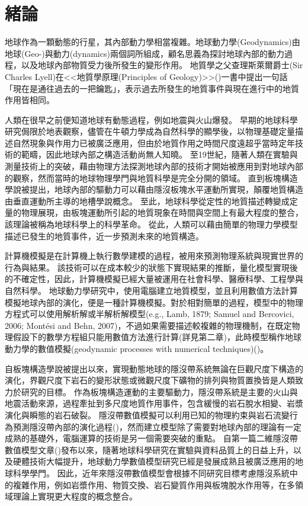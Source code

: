 
\chapter{緒論}

地球作為一顆動態的行星，其內部動力學相當複雜。地球動力學(Geodynamics)由地球(Geo-)與動力(dynamics)兩個詞所組成，顧名思義為探討地球內部的動力過程，以及地球內部物質受力後所發生的變形作用。
地質學之父查理斯萊爾爵士(Sir Charles Lyell)在<<地質學原理(Principles of Geology)>>(\citealp{lyell2009})一書中提出一句話「現在是通往過去的一把鑰匙」，表示過去所發生的地質事件與現在進行中的地質作用皆相同。

人類在很早之前便知道地球有動態過程，例如地震與火山爆發。
早期的地球科學研究侷限於地表觀察，儘管在牛頓力學成為自然科學的顯學後，以物理基礎定量描述自然現象與作用力已被廣泛應用，但由於地質作用之時間尺度遠超乎當時定年技術的範疇，因此地球內部之構造活動尚無人知曉。
至19世紀，隨著人類在實驗與測量技術上的突破，藉由物理方法探測地球內部的技術才開始被應用到對地球內部的觀察，然而當時的地球物理學門與地質科學是完全分開的領域。
直到板塊構造學說被提出，地球內部的驅動力可以藉由隱沒板塊水平運動所實現，顛覆地質構造由垂直運動所主導的地槽學說概念。
至此，地球科學從定性的地質描述轉變成定量的物理展現，由板塊運動所引起的地質現象在時間與空間上有最大程度的整合，該理論被稱為地球科學上的科學革命。
從此，人類可以藉由簡單的物理力學模型描述已發生的地質事件，近一步預測未來的地質構造。

計算機模擬是在計算機上執行數學建模的過程，被用來預測物理系統與現實世界的行為與結果。
該技術可以在成本較少的狀態下實現結果的推斷，量化模型實現後的不確定性，因此，計算機模擬已經大量被運用在社會科學、醫療科學、工程學與自然科學。
地球動力學研究中，使用電腦建立地質模型，並且利用數值方法計算模擬地球內部的演化，便是一種計算機模擬。對於相對簡單的過程，模型中的物理方程式可以使用解析解或半解析解模型(e.g., Lamb, 1879; Samuel and Bercovici, 2006; Montési and Behn, 2007)，不過如果需要描述較複雜的物理機制，在既定物理假設下的數學方程組只能用數值方法進行計算(詳見第二章)，此時模型稱作地球動力學的數值模擬(geodynamic processes with numerical techniques)(\citealp{101Geodynamics})。

自板塊構造學說被提出以來，實現動態地球的隱沒帶系統無論在巨觀尺度下構造的演化，界觀尺度下岩石的變形狀態或微觀尺度下礦物的排列與物質置換皆是人類致力於研究的目標。
作為板塊構造運動的主要驅動力，隱沒帶系統是主要的火山與地震活動來源，過程牽扯到多尺度地質作用事件，包含緩慢的岩石脫水相變、岩漿演化與瞬態的岩石破裂。
隱沒帶數值模擬可以利用已知的物理約束與岩石流變行為預測隱沒帶內部的演化過程(\citealp{Gerya2011})，然而建立模型除了需要對地球內部的理論有一定成熟的基礎外，電腦運算的技術是另一個需要突破的重點。
自第一篇二維隱沒帶數值模型文章(\citealp{minear1970thermal})發布以來，隨著地球科學研究在實驗與資料品質上的日益上升，以及硬體技術大幅提升，地球動力學數值模型研究已經是發展成熟且被廣泛應用的地球科學學門。
因此，近年來隱沒帶數值模型會根據不同研究目標考慮隱沒系統中的複雜作用，例如岩漿作用、物質交換、岩石變質作用與板塊脫水作用等，在多領域理論上實現更大程度的概念整合。

